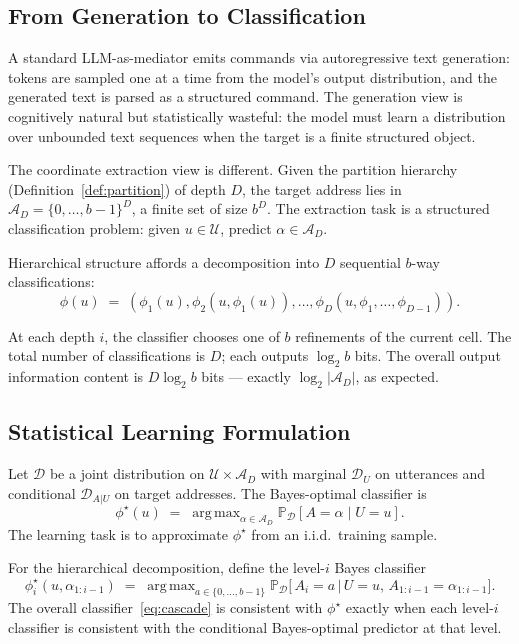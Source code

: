 \documentclass[11pt,a4paper]{article}
\theoremstyle{definition}
\theoremstyle{remark}
\DeclareMathOperator*{\argmax}{arg\,max}
\renewcommand{\Pr}{\mathbb{P}}
\newcommand{\Uc}{\mathcal{U}}
\begin{document}
\subsection{From Generation to Classification}

A standard LLM-as-mediator emits commands via autoregressive text generation: tokens are sampled one at a time from the model's output distribution, and the generated text is parsed as a structured command. The generation view is cognitively natural but statistically wasteful: the model must learn a distribution over unbounded text sequences when the target is a finite structured object.

The coordinate extraction view is different. Given the partition hierarchy (Definition~\ref{def:partition}) of depth $D$, the target address lies in $\mathcal{A}_D = \{0,\ldots,b-1\}^D$, a finite set of size $b^D$. The extraction task is a structured classification problem: given $u \in \Uc$, predict $\alpha \in \mathcal{A}_D$.

Hierarchical structure affords a decomposition into $D$ sequential $b$-way classifications:
\begin{equation}
\label{eq:cascade}
\phi(u) \;=\; (\phi_1(u), \phi_2(u, \phi_1(u)), \ldots, \phi_D(u, \phi_1, \ldots, \phi_{D-1})).
\end{equation}

At each depth $i$, the classifier chooses one of $b$ refinements of the current cell. The total number of classifications is $D$; each outputs $\log_2 b$ bits. The overall output information content is $D \log_2 b$ bits --- exactly $\log_2 |\mathcal{A}_D|$, as expected.

\subsection{Statistical Learning Formulation}

Let $\mathcal{D}$ be a joint distribution on $\Uc \times \mathcal{A}_D$ with marginal $\mathcal{D}_U$ on utterances and conditional $\mathcal{D}_{A|U}$ on target addresses. The Bayes-optimal classifier is
\[
\phi^\star(u) \;=\; \argmax_{\alpha \in \mathcal{A}_D} \Pr_{\mathcal{D}}[A = \alpha \mid U = u].
\]
The learning task is to approximate $\phi^\star$ from an i.i.d.\ training sample.

For the hierarchical decomposition, define the level-$i$ Bayes classifier
\[
\phi_i^\star(u, \alpha_{1:i-1}) \;=\; \argmax_{a \in \{0,\ldots,b-1\}} \Pr_{\mathcal{D}}\bigl[\, A_i = a \,\big|\, U = u,\, A_{1:i-1} = \alpha_{1:i-1}\bigr].
\]
The overall classifier~\eqref{eq:cascade} is consistent with $\phi^\star$ exactly when each level-$i$ classifier is consistent with the conditional Bayes-optimal predictor at that level.
\end{document}
